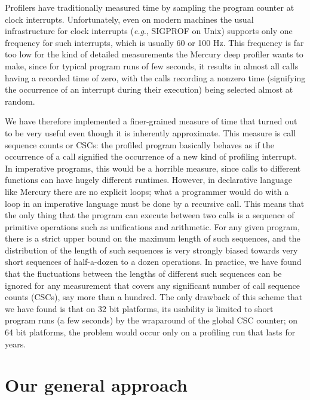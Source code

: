 {Profilers have traditionally measured time
by sampling the program counter at clock interrupts.
Unfortunately, even on modern machines
the usual infrastructure for clock interrupts (\emph{e.g}., SIGPROF on Unix)
supports only one frequency for such interrupts,
which is usually 60 or 100 Hz.
This frequency is far too low for the kind of detailed measurements
the Mercury deep profiler wants to make,
since for typical program runs of few seconds,
it results in almost all calls having a recorded time of zero,
with the calls recording a nonzero time
(signifying the occurrence of an interrupt during their execution)
being selected almost at random.

We have therefore implemented a finer-grained measure of time
that turned out to be very useful
even though it is inherently approximate.
This measure is call sequence counts or CSCs:
the profiled program basically behaves
as if the occurrence of a call signified
the occurrence of a new kind of profiling interrupt.
In imperative programs, this would be a horrible measure,
since calls to different functions can have hugely different runtimes.
However, in declarative language like Mercury there are no explicit loops;
what a programmer would do with a loop in an imperative language
must be done by a recursive call.
This means that the only thing that the program can execute between two calls
is a sequence of primitive operations such as unifications and arithmetic.
For any given program,
there is a strict upper bound on the maximum length of such sequences,
and the distribution of the length of such sequences
is very strongly biased towards very short sequences
of half-a-dozen to a dozen operations.
In practice, we have found that
the fluctuations between the lengths of different such sequences
can be ignored for any measurement
that covers any significant number of call sequence counts (CSCs),
say more than a hundred.
The only drawback of this scheme that we have found
is that on 32 bit platforms,
its usability is limited to short program runs (a few seconds)
by the wraparound of the global CSC counter;
on 64 bit platforms, the problem would occur
only on a profiling run that lasts for years.
}

\section{Our general approach}
\label{sec:approach}

% 

